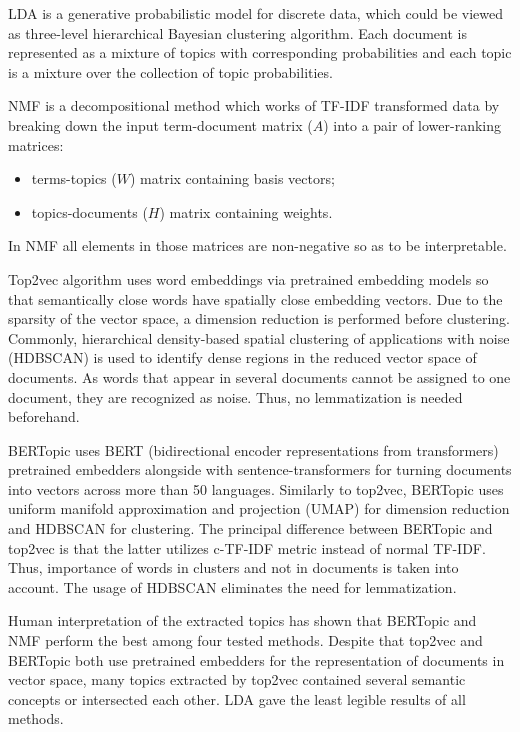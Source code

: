 \documentclass[3p,times,procedia]{elsarticle}
\begin{document}
LDA is a generative probabilistic model for discrete data, which could be viewed as three-level hierarchical Bayesian clustering algorithm. Each document is represented as a mixture of topics with corresponding probabilities and each topic is a mixture over the collection of topic probabilities.

NMF is a decompositional method which works of TF-IDF transformed data by breaking down the input term-document matrix ($A$) into a pair of lower-ranking matrices:
\begin{itemize}
	\item terms-topics ($W$) matrix containing basis vectors;
	\item topics-documents ($H$) matrix containing weights.
\end{itemize}
In NMF all elements in those matrices are non-negative so as to be interpretable.

Top2vec algorithm uses word embeddings via pretrained embedding models so that semantically close words have spatially close embedding vectors. Due to the sparsity of the vector space, a dimension reduction is performed before clustering. Commonly, hierarchical density-based spatial clustering of applications with noise (HDBSCAN) is used to identify dense regions in the reduced vector space of documents. As words that appear in several documents cannot be assigned to one document, they are recognized as noise. Thus, no lemmatization is needed beforehand.

BERTopic uses BERT (bidirectional encoder representations from transformers) pretrained embedders alongside with sentence-transformers for turning documents into vectors across more than 50 languages. Similarly to top2vec, BERTopic uses uniform manifold approximation and projection (UMAP) for dimension reduction and HDBSCAN for clustering. The principal difference between BERTopic and top2vec is that the latter utilizes c-TF-IDF metric instead of normal TF-IDF. Thus, importance of words in clusters and not in documents is taken into account. The usage of HDBSCAN eliminates the need for lemmatization.

Human interpretation of the extracted topics has shown that BERTopic and NMF perform the best among four tested methods. Despite that top2vec and BERTopic both use pretrained embedders for the representation of documents in vector space, many topics extracted by top2vec contained several semantic concepts or intersected each other. LDA gave the least legible results of all methods.
\end{document}
